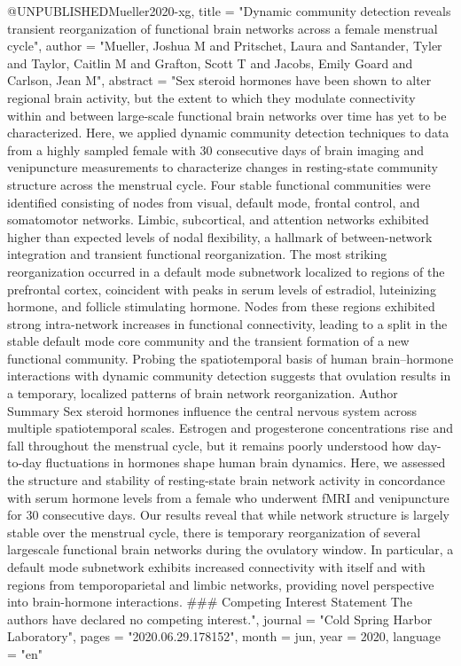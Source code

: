 @UNPUBLISHED{Mueller2020-xg,
	title    = "Dynamic community detection reveals transient reorganization of
	functional brain networks across a female menstrual cycle",
	author   = "Mueller, Joshua M and Pritschet, Laura and Santander, Tyler and
	Taylor, Caitlin M and Grafton, Scott T and Jacobs, Emily Goard
	and Carlson, Jean M",
	abstract = "Sex steroid hormones have been shown to alter regional brain
	activity, but the extent to which they modulate connectivity
	within and between large-scale functional brain networks over
	time has yet to be characterized. Here, we applied dynamic
	community detection techniques to data from a highly sampled
	female with 30 consecutive days of brain imaging and venipuncture
	measurements to characterize changes in resting-state community
	structure across the menstrual cycle. Four stable functional
	communities were identified consisting of nodes from visual,
	default mode, frontal control, and somatomotor networks. Limbic,
	subcortical, and attention networks exhibited higher than
	expected levels of nodal flexibility, a hallmark of
	between-network integration and transient functional
	reorganization. The most striking reorganization occurred in a
	default mode subnetwork localized to regions of the prefrontal
	cortex, coincident with peaks in serum levels of estradiol,
	luteinizing hormone, and follicle stimulating hormone. Nodes from
	these regions exhibited strong intra-network increases in
	functional connectivity, leading to a split in the stable default
	mode core community and the transient formation of a new
	functional community. Probing the spatiotemporal basis of human
	brain--hormone interactions with dynamic community detection
	suggests that ovulation results in a temporary, localized
	patterns of brain network reorganization. Author Summary Sex
	steroid hormones influence the central nervous system across
	multiple spatiotemporal scales. Estrogen and progesterone
	concentrations rise and fall throughout the menstrual cycle, but
	it remains poorly understood how day-to-day fluctuations in
	hormones shape human brain dynamics. Here, we assessed the
	structure and stability of resting-state brain network activity
	in concordance with serum hormone levels from a female who
	underwent fMRI and venipuncture for 30 consecutive days. Our
	results reveal that while network structure is largely stable
	over the menstrual cycle, there is temporary reorganization of
	several largescale functional brain networks during the ovulatory
	window. In particular, a default mode subnetwork exhibits
	increased connectivity with itself and with regions from
	temporoparietal and limbic networks, providing novel perspective
	into brain-hormone interactions. \#\#\# Competing Interest
	Statement The authors have declared no competing interest.",
	journal  = "Cold Spring Harbor Laboratory",
	pages    = "2020.06.29.178152",
	month    =  jun,
	year     =  2020,
	language = "en"
}


